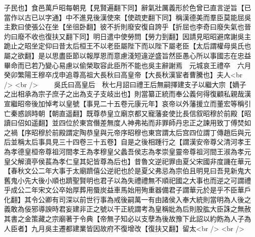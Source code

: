 子民也】食邑萬戶昭每朝見【見賢遍翻下同】辭氣壯厲義形於色曾已直言逆旨【已當作以古已以字通】中不進見後漢使來【使疏吏翻下同】稱漢德美而羣臣莫能屈吳主歎曰使張公在坐【坐徂卧翻】彼不折則廢安復自誇乎【折屈也李奇曰廢失氣也晉灼曰廢不收也復扶又翻下同】明日遣中使勞問【勞力到翻】因請見昭昭避席謝吳主跪止之昭坐定仰曰昔太后桓王不以老臣屬陛下而以陛下屬老臣【太后謂權母吳氏也屬之欲翻】是以思盡臣節以報厚恩而意慮淺短違逆盛旨然臣愚心所以事國志在忠益畢命而已若乃變心易慮以偷榮取容此臣所不能也吳主辭謝焉　元城哀王禮卒　六月癸卯繁陽王穆卒戊申追尊高祖大長秋曰高皇帝【大長秋漢宦者曹騰也】夫人<br />
<br />
　　吳氏曰高皇后　秋七月詔曰禮王后無嗣擇建支子以繼大宗【嫡子之出相承為宗子庶子之出為支子支岐出也】則當纂正統而奉公義何得復顧私親哉漢宣繼昭帝後加悼考以皇號【事見二十五卷元康元年】哀帝以外藩援立而董宏等稱引亡秦惑誤時朝【朝直遥翻】既尊恭皇立廟京都又寵藩妾使比長信叙昭穆於前殿【昭讀曰佋如遥翻】並四位於東宫僭差無度人神弗祐而非罪師丹忠正之諫用致丁傅焚如之禍【序昭穆於前殿謂定陶恭皇與元帝序昭穆也東宫謂太后宫四位謂丁傳趙后與元后並稱太后事具見三十四卷三十五卷】自是之後相踵行之【謂漢安帝尊父清河孝王為孝德皇桓帝尊祖河間孝王為孝穆皇父蠡吾侯志為孝崇皇靈帝尊祖河間王淑為孝元皇父解瀆亭侯萇為孝仁皇其妃皆尊為后也】昔魯文逆祀罪由夏父宋國非度譏在華元【春秋文公二年大事于太廟躋僖公逆祀也於是夏父弗忌為宗伯且明見曰吾見新鬼大舊鬼小先大後小順也躋聖賢明也君子以為失禮禮無不順祀國之大事也而逆之可謂禮乎成公二年宋文公卒始厚葬用蜃炭益車馬始用殉重器備君子謂華元於是乎不臣華戶化翻】其令公卿有司深以前世行事為戒後嗣萬一有由諸侯入奉大統則當明為人後之義敢為佞邪導諛時君妄建非正之號以干正統謂考為皇稱妣為后則股肱大臣誅之無赦其書之金策藏之宗廟著于令典【帝無子知必以支孽為後故豫下此詔以約飭為人子為人臣者】九月吳主遷都建業皆因故府不復增改【復扶又翻】留太<br />
<br />
